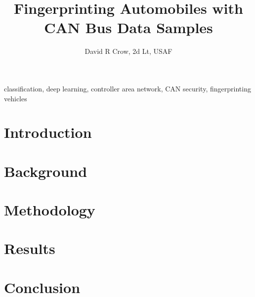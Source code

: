 \documentclass[journal, 12pt]{IEEEtran}
\title{Fingerprinting Automobiles with \\ CAN Bus Data Samples}
\author{David R Crow, 2d Lt, USAF}
\begin{document}
\onecolumn
\maketitle



\begin{IEEEkeywords}
classification, deep learning, controller area network, CAN security, fingerprinting vehicles
\end{IEEEkeywords}

\section{Introduction}\label{sec:intro}


\section{Background}\label{sec:background}


\section{Methodology}\label{sec:method}


\section{Results}\label{sec:results}


\section{Conclusion}\label{sec:conclusion}





% 
\end{document}
